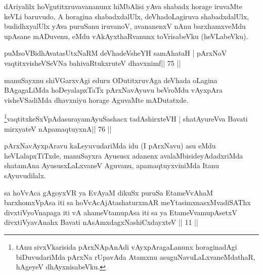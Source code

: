 \begin{artha}
dAriyalilx hoVgutitxruvavananunx hiMbAlisi yAva shabadx horage iruvaMte keVLi baruvudo, A horagina shabadxdalUlx, deVhadoLagiruva shabadxdalUlx, budidhxyalUlx yAva puruSanu iruvanoV, avananenxV nAnu barxhamxveMdu upAsane mADuvenu, eMdu vAkAyxthaRvanunx toVrisabeVku (heVLabeVku).
\end{artha} 
 

\begin{shl}
puMsoV\s BidhAvatasUtxNaRM deVhadeVsheYH samAhataH |
pArxNoV vaqtitxvisheVSeVNa bahivaRtukxruteV dhavxnimf\hfill || 75 ||
\end{shl}

\begin{artha}
manuSayxnu shiVGarxvAgi eduru ODutitxruvAga deVhada oLagina BAgagaLiMda hoDeyalapxTaTx pArxNavAyuvu beVroMdu vAyxpAra visheVSadiMda dhavxniyu horage AguvaMte mADutatxde.
\end{artha} 
 


\begin{shl}
\footnote{tAnu sivxVkarisida pArxNApAnAdi vAyxpAragaLanunx horaginadAgi biDuvudariMda pArxNa rUpavAda Atamxnu asuguNavuLaLxvaneMdathaR, hAgeyeV dhAyxnisabeVku.}vaqtitxkeSxVpAdasurayamAyuSashacx tadAshirxteVH |
shatAyureVva Bavati mirxyateV nApamaqtuyxnA\hfill || 76 ||
\end{shl}

\begin{artha}
pArxNavAyxpAravu kaLeyuvudariMda idu (I pArxNavu) asu eMdu heVLalapxTiTxde, manuSayxra Ayususx adanenx avalaMbisideyAdadxriMda shatamAna AyususxLaLxvaneV Aguvanu, apamaqtuyxviniMda Itanu sAyuvudilalx.
\end{artha}



\begin{kandikeshl}
sa hoVvAca gAgoyxVR ya EvAyaM dikuSx puruSa EtameVvAhaM barxhomxVpAsa iti sa hoVvAcAjAtashaturxmAR meYtasimxnasxMvadiSAThx divxtiVyoV\s napaga iti vA ahameVtamupAsa iti sa ya EtameVvamupAsetxV divxtiVyavAnahx Bavati nAsAmxdagxNashiCxdayxteV || 11 ||
\end{kandikeshl}


